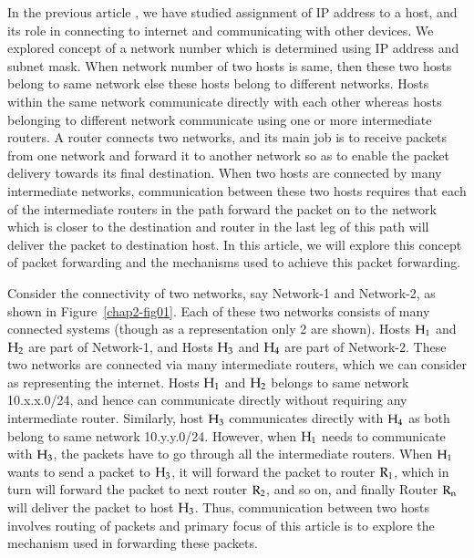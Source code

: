 \begin{multicols}{2}

In the previous article \cite{art2-key01}, we have studied assignment of IP address \cite{art2-key02} to a host, and its role in connecting to internet and communicating with other devices. We explored concept of a network number which is determined using IP address and subnet mask. When network number of two hosts is same, then these two hosts belong to same network else these hosts belong to different networks. Hosts within the same network communicate directly with each other whereas hosts belonging to different network communicate using one or more intermediate routers. A router connects two networks, and its main job is to receive packets from one network and forward it to another network so as to enable the packet delivery towards its final destination. When two hosts are connected by many intermediate networks, communication between these two hosts requires that each of the intermediate routers in the path forward the packet on to the network which is closer to the destination and router in the last leg of this path will deliver the packet to destination host. In this article, we will explore this concept of packet forwarding and the mechanisms used to achieve this packet forwarding.

Consider the connectivity of two networks, say Network-1 and Network-2, as shown in Figure~\ref{chap2-fig01}. Each of these two networks consists of many connected systems (though as a representation only 2 are shown). Hosts ${\rm H}_1$ and ${\rm H}_2$ are part of Network-1, and Hosts ${\rm H}_3$ and ${\rm H}_4$ are part of Network-2. These two networks are connected via many intermediate routers, which we can consider as representing the internet. Hosts ${\rm H}_1$ and ${\rm H}_2$ belongs to same network 10.x.x.0/24, and hence can communicate directly without requiring any intermediate router. Similarly, host ${\rm H}_3$ communicates directly with ${\rm H}_4$ as both belong to same network 10.y.y.0/24. However, when ${\rm H}_1$ needs to communicate with ${\rm H}_3$, the packets have to go through all the intermediate routers. When ${\rm H}_1$ wants to send a packet to ${\rm H}_3$, it will forward the packet to router ${\rm R}_1$, which in turn will forward the packet to next router ${\rm R}_2$, and so on, and finally Router ${\rm R}_{\rm n}$ will deliver the packet to host ${\rm H}_3$. Thus, communication between two hosts involves routing of packets and primary focus of this article is to explore the mechanism used in forwarding these packets.
\end{multicols}

